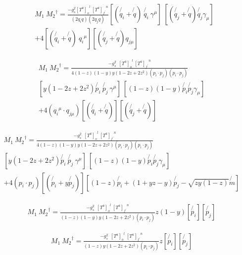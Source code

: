 \begin{equation}
\begin{split}
&M_1\: {M_2}^{\dagger} = \frac{-g_s^2 {[T^a]_o}^l \:{[T^a]_{f^{\prime}}}^n }{(2q_i q)(2q_j q)} 
[(\not{q_i} + \not{q})\:\not{q_i}\: \gamma^{\mu}] \:[(\not{q_j} + \not{q}) \not{q_j} \gamma_{\mu}] \\
&+4[(\not{q_i} + \not{q})\:{q_{i}}^{\mu}][(\not{q_j} + \not{q}) {q_{j{\mu}}}]
\end{split}
\end{equation}

\begin{equation}
\begin{split}
M_1\: {M_2}^{\dagger} = \frac{-g_s^2 \:\:{[T^a]_o}^l \:{[T^a]_{f^{\prime}}}^n }{4(1-z)(1-y)y(1-2z+2z^2)(p_i \cdot p_j)(p_i \cdot p_j)} \\
[y(1-2z+2z^2)\not{p_i}\:\not{p_j}\: \gamma^{\mu}] \:[(1-z)(1-y)\not{p_i} \not{p_j} \gamma_{\mu}] \\
+4({q_{i}}^{\mu} \cdot {q_{j{\mu}}})[(\not{q_i} + \not{q})][(\not{q_j} + \not{q})]
\end{split}
\end{equation}

\begin{equation}
\begin{split}
M_1\: {M_2}^{\dagger} = \frac{-g_s^2 \:\:{[T^a]_o}^l \:{[T^a]_{f^{\prime}}}^n }{4(1-z)(1-y)y(1-2z+2z^2)(p_i \cdot p_j)(p_i \cdot p_j)} \\
[y(1-2z+2z^2)\not{p_i}\:\not{p_j}\: \gamma^{\mu}] \:[(1-z)(1-y)\not{p_i} \not{p_j} \gamma_{\mu}] \\
+4(p_i \cdot p_j)[(\not{p_i} + y\not{p_j})][(1-z)\not{p_i} + (1+yz-y) \not{p_j} - \sqrt{zy(1-z)}\not{m}]
\end{split}
\end{equation}

\begin{equation}
\begin{split}
M_1\: {M_2}^{\dagger} = \frac{-g_s^2 \:\:{[T^a]_o}^l \:{[T^a]_{f^{\prime}}}^n }{(1-z)(1-y)y(1-2z+2z^2)(p_i \cdot p_j)} 
z(1-y)[\not{p_i}][\not{p_j}]
\end{split}
\end{equation}







\begin{equation}
\begin{split}
M_1\: {M_2}^{\dagger} = \frac{-g_s^2 \:\:{[T^a]_o}^l \:{[T^a]_{f^{\prime}}}^n }{(1-z)y(1-2z+2z^2)(p_i \cdot p_j)} 
z[\not{p_i}][\not{p_j}]
\end{split}
\end{equation}


